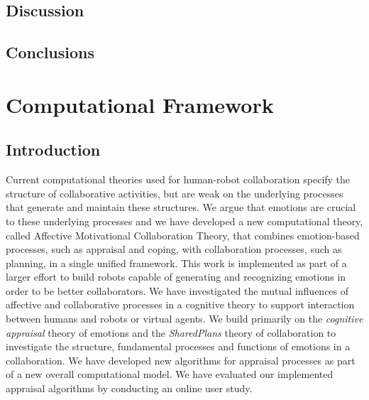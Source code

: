 \documentclass[12pt]{report}
\begin{document}
\section{Discussion}
\label{sec:discussion-crowdsourcing}

\section{Conclusions}
\label{sec:conclusions-crowdsourcing}

\chapter{Computational Framework}
\label{ch:framework}

\section{Introduction}
Current computational theories used for human-robot collaboration specify the
structure of collaborative activities, but are weak on the underlying processes
that generate and maintain these structures. We argue that emotions are crucial
to these underlying processes and we have developed a new computational theory,
called Affective Motivational Collaboration Theory, that combines emotion-based
processes, such as appraisal and coping, with collaboration processes, such as
planning, in a single unified framework. This work is implemented as part of a
larger effort to build robots capable of generating and recognizing emotions in
order to be better collaborators. We have investigated the mutual influences of
affective and collaborative processes in a cognitive theory to support
interaction between humans and robots or virtual agents. We build primarily on
the \textit{cognitive appraisal} theory of emotions and the \textit{SharedPlans}
theory of collaboration to investigate the structure, fundamental processes and
functions of emotions in a collaboration. We have developed new algorithms for
appraisal processes as part of a new overall computational model. We have
evaluated our implemented appraisal algorithms by conducting an online user
study.
\end{document}
